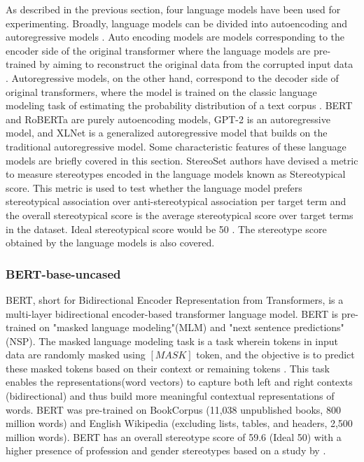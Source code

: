 As described in the previous section, four language models have been used for experimenting. Broadly, language models can be divided into autoencoding and autoregressive models \cite{yang2019xlnet}. Auto encoding models are models corresponding to the encoder side of the original transformer \cite{vaswani2017attention} where the language models are pre-trained by aiming to reconstruct the original data from the corrupted input data \cite{yang2019xlnet}. Autoregressive models, on the other hand, correspond to the decoder side of original transformers, where the model is trained on the classic language modeling task of estimating the probability distribution of a text corpus \cite{yang2019xlnet}. BERT and RoBERTa are purely autoencoding models, GPT-2 is an autoregressive model, and XLNet is a generalized autoregressive model that builds on the traditional autoregressive model. Some characteristic features of these language models are briefly covered in this section. StereoSet authors have devised a metric to measure stereotypes encoded in the language models known as  Stereotypical score. This metric is used to test whether the language model prefers stereotypical association over anti-stereotypical association per target term \cite{nadeem2020stereoset} and the overall stereotypical score is the average stereotypical score over target terms in the dataset. Ideal stereotypical score would be 50 \cite{nadeem2020stereoset}. The stereotype score obtained by the language models is also covered.   

\subsubsection{BERT-base-uncased}

BERT, short for Bidirectional Encoder Representation from Transformers, is a multi-layer bidirectional encoder-based transformer language model\cite{devlin2018bert}. BERT is pre-trained on "masked language modeling"(MLM) and "next sentence predictions"(NSP). The masked language modeling task is a task wherein tokens in input data are randomly masked using $[MASK]$ token, and the objective is to predict these masked tokens based on their context or remaining tokens \cite{devlin2018bert}. This task enables the representations(word vectors) to capture both left and right contexts (bidirectional) and thus build more meaningful contextual representations of words. BERT was pre-trained on BookCorpus (11,038 unpublished books, 800 million words) and English Wikipedia (excluding lists, tables, and headers, 2,500 million words). BERT has an overall stereotype score of 59.6 (Ideal 50) with a higher presence of profession and gender stereotypes based on a study by \cite{nadeem2020stereoset}. 

